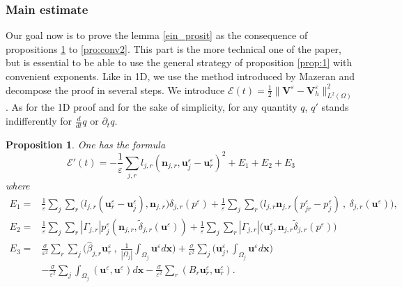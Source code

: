 \documentclass[a4paper,french,english,10pt]{article}
\newcommand\uu{\mathbf{u}}
\newcommand\eps{\varepsilon}
\newcommand\x{\mathbf{x}}
\newcommand\V{\mathbf{V}}
\newtheorem{pro}[theorem]{Proposition}
\begin{document}
\subsubsection{Main estimate}

Our goal now is to prove the lemma \ref{ein_prosit}  %
as  the consequence
of propositions \ref{pro:conv1} to \ref{pro:conv2}.
This part is the more technical one of the paper, but is essential
to be able to use the general strategy of proposition
\ref{prop:1} with convenient exponents. 
Like in 1D, we use the method introduced by Mazeran \cite{Mazeran} and decompose
the proof in several steps.
We introduce
$\mathscr{E}(t)=\frac12 \|\V^{\eps}-\V^{\eps}_h\|_{L^2(\Omega)}^2$.
As for the 1D proof and for the sake of simplicity, for any quantity $q$,   $q'$ stands indifferently for  $\frac{d}{dt}q $ or $\partial_t q $.

\begin{pro} \label{pro:conv1}
One has the formula
\begin{equation} \label{eq:ee1}
\mathscr{E}'(t) =
-\frac{1}{\eps}\sum_{j,r}l_{j,r}(\mathbf{n}_{j,r},\mathbf{u}_j^{\eps}-\mathbf{u}
_r^{\eps})^2 +E_1+E_2+E_3
\end{equation}
where
$$
\begin{aligned}
E_1=& \frac{1}{\eps} \sum_j \sum_r \bigg(
l_{j,r}(\mathbf{u}_r^{\eps}-\mathbf{u}_j^{\eps}),\mathbf{n}_{j,r} \bigg)
\delta_{j,r}(p^{\eps}) +\frac{1}{\eps} \sum_j \sum_r \bigg( 
 l_{j,r}\mathbf{n}_{j,r} ( p_{jr}^{\eps}  - p_j^{\eps}) \: , \:
\delta_{j,r}(\uu^{\eps}) \bigg), \\
E_2=&\frac{1}{\eps}\sum_j \sum_r  |\Gamma_{j,r} | p_j^{\eps} (\mathbf{n}_{j,r} ,
\tilde{\delta}_{j,r}(\uu^{\eps}) ) + \frac{1}{\eps}\sum_j \sum_r |\Gamma_{j,r} | \bigg(
\mathbf{u}_j^{\eps} , \mathbf{n}_{j,r} \tilde{\delta}_{j,r}(p^{\eps}) \bigg) \\
E_3=&\frac{\sigma}{\eps^2} \sum_r \sum_j 
\bigg(\widehat{\beta}_{j,r}\mathbf{u}_r^{\eps}  \: , \:
\frac{1}{|\Omega_j|}\int_{\Omega_j} \uu^{\eps} d\x \bigg)
+\frac{\sigma}{\eps^2}\sum_j\bigg(  \mathbf{u}_j^{\eps} ,
\int_{\Omega_j}\uu^{\eps}d\x \bigg) \\
&
-\frac{\sigma}{\eps^2}\sum_j\int_{\Omega_j}(\uu^{\eps},\uu^{\eps}
)d\x -\frac{\sigma}{\eps^2}\sum_{r}
(B_{r}\mathbf{u}_r^{\eps},\textbf{u}_r^{\eps}).
\end{aligned}
$$
\end{pro}
\end{document}
